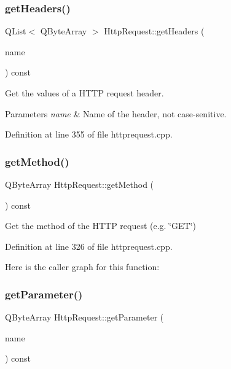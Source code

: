 \subsubsection{\texorpdfstring{get\+Headers()}{getHeaders()}}
{\footnotesize\ttfamily Q\+List$<$ Q\+Byte\+Array $>$ Http\+Request\+::get\+Headers (\begin{DoxyParamCaption}\item[{const Q\+Byte\+Array \&}]{name }\end{DoxyParamCaption}) const}

Get the values of a H\+T\+TP request header. 
\begin{DoxyParams}{Parameters}
{\em name} & Name of the header, not case-\/senitive. \\
\hline
\end{DoxyParams}


Definition at line 355 of file httprequest.\+cpp.

\mbox{\label{classstefanfrings_1_1_http_request_ae3c92d9c0f5279c6d5b1bfdb47aaa5e0}} 
\subsubsection{\texorpdfstring{get\+Method()}{getMethod()}}
{\footnotesize\ttfamily Q\+Byte\+Array Http\+Request\+::get\+Method (\begin{DoxyParamCaption}{ }\end{DoxyParamCaption}) const}

Get the method of the H\+T\+TP request (e.\+g. \char`\"{}\+G\+E\+T\char`\"{}) 

Definition at line 326 of file httprequest.\+cpp.

Here is the caller graph for this function\+:
\mbox{\label{classstefanfrings_1_1_http_request_ad231eca50e6a0cba6b01c5093542447e}} 
\subsubsection{\texorpdfstring{get\+Parameter()}{getParameter()}}
{\footnotesize\ttfamily Q\+Byte\+Array Http\+Request\+::get\+Parameter (\begin{DoxyParamCaption}\item[{const Q\+Byte\+Array \&}]{name }\end{DoxyParamCaption}) const}

